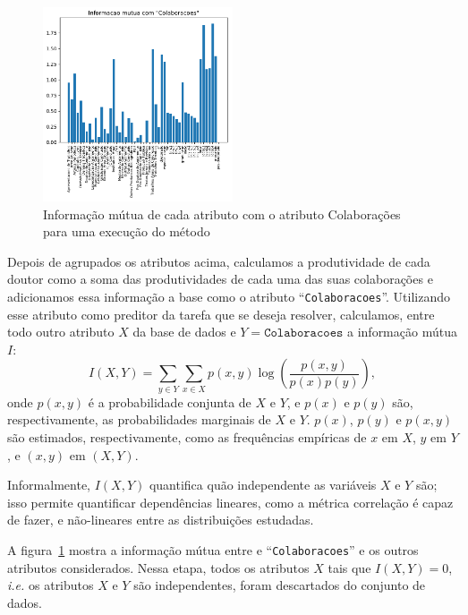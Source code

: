 \documentclass[12pt]{article}
\begin{document}
\begin{figure}
  \centering
  \includegraphics[width=0.5\textwidth]{graphs/mutual_information.pdf}
  \vspace{-15pt}
  \caption{Informação mútua de cada atributo com o atributo Colaborações para uma execução do método}
  \label{fig:mutual-info}
\end{figure}

Depois de agrupados os atributos acima, calculamos a produtividade de cada doutor como a soma das produtividades de cada uma das suas colaborações e adicionamos essa informação a base como o atributo ``\texttt{Colaboracoes}''.
Utilizando esse atributo como preditor da tarefa que se deseja resolver, calculamos, entre todo outro atributo $X$ da base de dados e $Y = \texttt{Colaboracoes}$ a informação mútua $I$:
\begin{equation}
  I(X, Y) = \sum_{y \in Y} \sum_{x \in X} p(x, y) \log \left( \frac{p(x, y)}{p(x)p(y)} \right),
\end{equation}
onde $p(x, y)$ é a probabilidade conjunta de $X$ e $Y$, e $p(x)$ e $p(y)$ são, respectivamente, as probabilidades marginais de $X$ e $Y$.
$p(x)$, $p(y)$ e $p(x, y)$ são estimados, respectivamente, como as frequências empíricas de $x$ em $X$, $y$ em $Y$, e $(x, y)$ em $(X, Y)$.

Informalmente, $I(X, Y)$ quantifica quão independente as variáveis $X$ e $Y$ são; isso permite quantificar dependências lineares, como a métrica correlação é capaz de fazer, e não-lineares entre as distribuições estudadas.

A figura~\ref{fig:mutual-info} mostra a informação mútua entre e ``\texttt{Colaboracoes}'' e os outros atributos considerados.
Nessa etapa, todos os atributos $X$ tais que $I(X, Y) = 0$, \emph{i.e.} os atributos $X$ e $Y$ são independentes, foram descartados do conjunto de dados.
\end{document}
